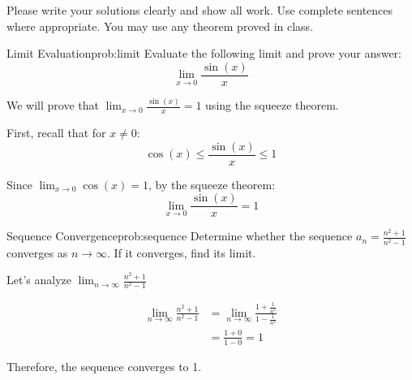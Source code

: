 \documentclass[12pt,a4paper]{article}
\begin{document}
\begin{note}
    Please write your solutions clearly and show all work. Use complete sentences
    where appropriate. You may use any theorem proved in class.
\end{note}

\begin{Problem}{Limit Evaluation}{prob:limit}
    Evaluate the following limit and prove your answer:
    \[\lim_{x \to 0} \frac{\sin(x)}{x}\]
\end{Problem}

\begin{solution}
    We will prove that $\lim_{x \to 0} \frac{\sin(x)}{x} = 1$ using the squeeze theorem.
    
    First, recall that for $x \neq 0$:
    \[\cos(x) \leq \frac{\sin(x)}{x} \leq 1\]
    
    Since $\lim_{x \to 0} \cos(x) = 1$, by the squeeze theorem:
    \[\lim_{x \to 0} \frac{\sin(x)}{x} = 1\]
\end{solution}

\begin{Problem}{Sequence Convergence}{prob:sequence}
    Determine whether the sequence $a_n = \frac{n^2 + 1}{n^2 - 1}$ converges as $n \to \infty$.
    If it converges, find its limit.
\end{Problem}

\begin{solution}
    Let's analyze $\lim_{n \to \infty} \frac{n^2 + 1}{n^2 - 1}$
    
    \begin{align*}
        \lim_{n \to \infty} \frac{n^2 + 1}{n^2 - 1} 
        &= \lim_{n \to \infty} \frac{1 + \frac{1}{n^2}}{1 - \frac{1}{n^2}} \\
        &= \frac{1 + 0}{1 - 0} = 1
    \end{align*}
    
    Therefore, the sequence converges to 1.
\end{solution}
\end{document}
